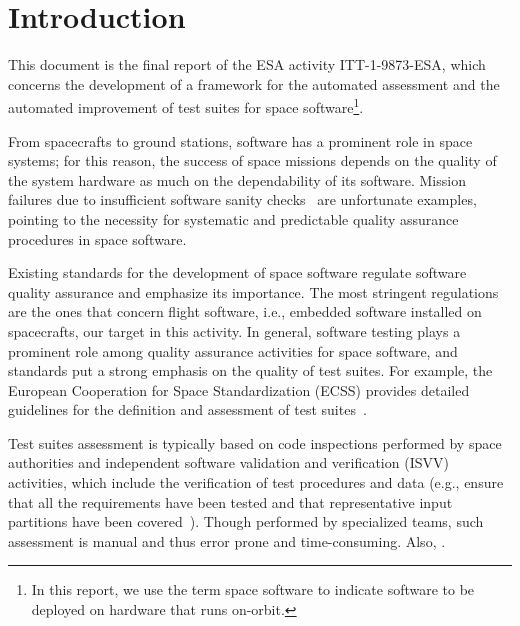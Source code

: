 
\chapter*{Introduction}
\label{sec:introduction}

This document is the final report of the ESA activity ITT-1-9873-ESA, which concerns the development of a framework for the automated assessment and the automated improvement of test suites for space software\footnote{In this report, we use the term space software to indicate software to be deployed on hardware that runs on-orbit.}.

From spacecrafts to ground stations, software has a prominent role in space systems; for this reason, the success of space missions depends on the quality of the system hardware as much on the dependability of its software. Mission failures due to insufficient software sanity checks~\cite{Schiaparelli} are unfortunate examples, pointing to the necessity for systematic and predictable quality assurance procedures in space software.


Existing standards for the development of space software regulate software quality assurance and emphasize its importance.
The most stringent regulations are the ones that concern flight software, i.e., embedded software installed on spacecrafts, our target in this activity.
In general, software testing plays a prominent role among  quality assurance activities for space software, and standards put a strong emphasis on the quality of test suites. For example, the European Cooperation for Space Standardization (ECSS) provides detailed guidelines for the definition and assessment of test suites~\cite{ecss80C,ecss40C}.

Test suites assessment
is typically based on code inspections performed by space authorities and
independent software validation and verification (ISVV) activities, which include the verification of test procedures and data (e.g., ensure that all the requirements have been tested and that representative input partitions have been covered~\cite{ISVV}). Though performed by specialized teams, such assessment is manual and thus error prone and time-consuming. 
 Also, .

